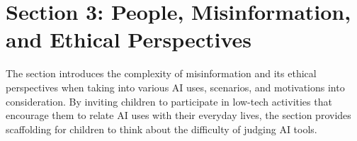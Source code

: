 \documentclass{article}
\begin{document}
\newpage
{}
\BgThispage
\vspace*{\fill}
\section*{\centering Section 3: People, Misinformation, and Ethical Perspectives}
%

The section introduces the complexity of misinformation and its ethical perspectives when taking into various AI uses, scenarios, and motivations into consideration. By inviting children to participate in low-tech activities that encourage them to relate AI uses with their everyday lives, the section provides scaffolding for children to think about the difficulty of judging AI tools. 
\vspace*{\fill}
\end{document}
